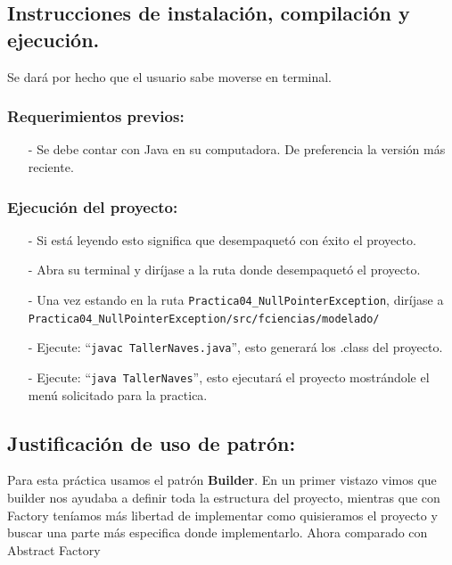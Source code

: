 \documentclass{article}
\newcommand{\code}[1]{\textcolor{white!25!black}{\texttt{#1}}}
\begin{document}
\subsection*{Instrucciones de instalación, compilación y ejecución.}
Se dará por hecho que el usuario sabe moverse en terminal.\\

\subsubsection*{Requerimientos previos:}
\begin{itemize}
\item[-] Se debe contar con Java en su computadora. De preferencia la versión más reciente.
\end{itemize}

\subsubsection*{Ejecución del proyecto:}
\begin{itemize}
\item[-] Si está leyendo esto significa que desempaquetó con éxito el proyecto.
\item[-] Abra su terminal y diríjase a la ruta donde desempaquetó el proyecto.
\item[-] Una vez estando en la ruta \code{Practica04\_NullPointerException}, diríjase a
  \code{Practica04\_NullPointerException/src/fciencias/modelado/}
\item[-] Ejecute: “\code{javac TallerNaves.java}”, esto generará los .class del proyecto.
\item[-] Ejecute: “\code{java TallerNaves}”, esto ejecutará el proyecto mostrándole el menú solicitado para la practica.
\end{itemize}

\newpage
\subsection*{Justificación de uso de patrón:}
Para esta práctica usamos el patrón \textbf{Builder}. En un primer vistazo vimos que builder nos ayudaba a definir toda la estructura del proyecto, mientras que con Factory teníamos más libertad de implementar como quisieramos el proyecto y buscar una parte más especifica donde implementarlo. Ahora comparado con Abstract Factory
\end{document}
